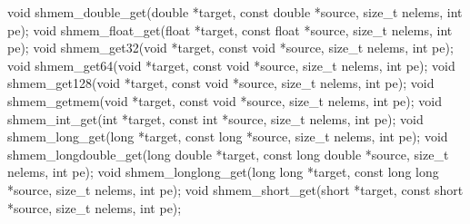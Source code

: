\synC   %

void shmem_double_get(double *target, const double  *source, size_t nelems, int pe);
void shmem_float_get(float *target, const float *source, size_t nelems, int pe);
void shmem_get32(void *target, const void *source, size_t  nelems,  int pe);
void shmem_get64(void  *target, const void *source, size_t nelems, int pe);
void shmem_get128(void *target, const void *source, size_t nelems,  int pe);
void shmem_getmem(void *target, const void *source, size_t nelems, int pe);
void shmem_int_get(int *target, const int *source, size_t  nelems,  int pe);
void shmem_long_get(long *target, const long *source, size_t nelems, int pe);
void shmem_longdouble_get(long double *target, const long double *source, size_t nelems, int pe);
void shmem_longlong_get(long long *target, const long long *source, size_t nelems, int pe);
void shmem_short_get(short *target, const short *source, size_t nelems, int pe); %
\synF   %

